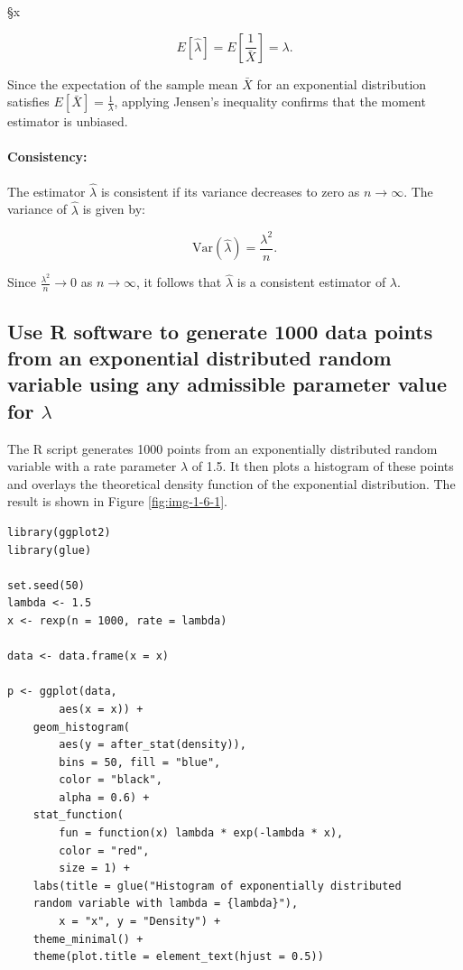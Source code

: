 §x\documentclass[]{article}
\begin{document}
\begin{equation}
	E[\hat{\lambda}] = E\left[\frac{1}{\bar{X}}\right] = \lambda.
\end{equation}

Since the expectation of the sample mean $\bar{X}$ for an exponential distribution satisfies $E[\bar{X}] = \frac{1}{\lambda}$, applying Jensen's inequality confirms that the moment estimator is unbiased.

\paragraph{Consistency:} The estimator $\hat{\lambda}$ is consistent if its variance decreases to zero as $n \to \infty$. The variance of $\hat{\lambda}$ is given by:

\begin{equation}
	\text{Var}(\hat{\lambda}) = \frac{\lambda^2}{n}.
\end{equation}

Since $\frac{\lambda^2}{n} \to 0$ as $n \to \infty$, it follows that $\hat{\lambda}$ is a consistent estimator of $\lambda$.

	

\subsection{Use R software to generate 1000 data points from an exponential distributed random variable using
	any admissible parameter value for $\lambda$}

The R script generates 1000 points from an exponentially distributed random variable with a rate parameter $\lambda$ of 1.5. It then plots a histogram of these points and overlays the theoretical density function of the exponential distribution. The result is shown in Figure \ref{fig:img-1-6-1}.

\bigskip

\begin{lstlisting}
library(ggplot2)
library(glue)

set.seed(50)
lambda <- 1.5
x <- rexp(n = 1000, rate = lambda)

data <- data.frame(x = x)

p <- ggplot(data,
		aes(x = x)) +
	geom_histogram(
		aes(y = after_stat(density)),
		bins = 50, fill = "blue",
		color = "black",
		alpha = 0.6) +
	stat_function(
		fun = function(x) lambda * exp(-lambda * x),
		color = "red",
		size = 1) +
	labs(title = glue("Histogram of exponentially distributed 
	random variable with lambda = {lambda}"),
		x = "x", y = "Density") +
	theme_minimal() +
	theme(plot.title = element_text(hjust = 0.5))
\end{lstlisting}
\end{document}
